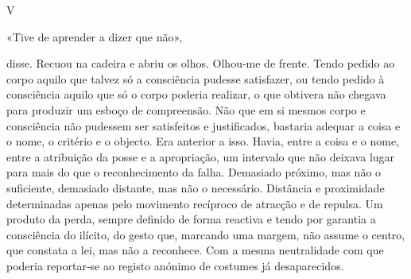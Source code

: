 V

«Tive de aprender a dizer que não»,

disse. Recuou na cadeira e abriu os olhos. Olhou­‑me de frente. Tendo
pedido ao corpo aquilo que talvez só a consciência pudesse satisfazer,
ou tendo pedido à consciência aquilo que só o corpo poderia realizar, o
que obtivera não chegava para produzir um esboço de compreensão. Não que
em si mesmos corpo e consciência não pudessem ser satisfeitos e
justificados, bastaria adequar a coisa e o nome, o critério e o objecto.
Era anterior a isso. Havia, entre a coisa e o nome, entre a atribuição
da posse e a apropriação, um intervalo que não deixava lugar para mais
do que o reconhecimento da falha. Demasiado próximo, mas não o
suficiente, demasiado distante, mas não o necessário. Distância e
proximidade determinadas apenas pelo movimento recíproco de atracção e
de repulsa. Um produto da perda, sempre definido de forma reactiva e
tendo por garantia a consciência do ilícito, do gesto que, marcando uma
margem, não assume o centro, que constata a lei, mas não a reconhece.
Com a mesma neutralidade com que poderia reportar­‑se ao registo anónimo
de costumes já desaparecidos.

